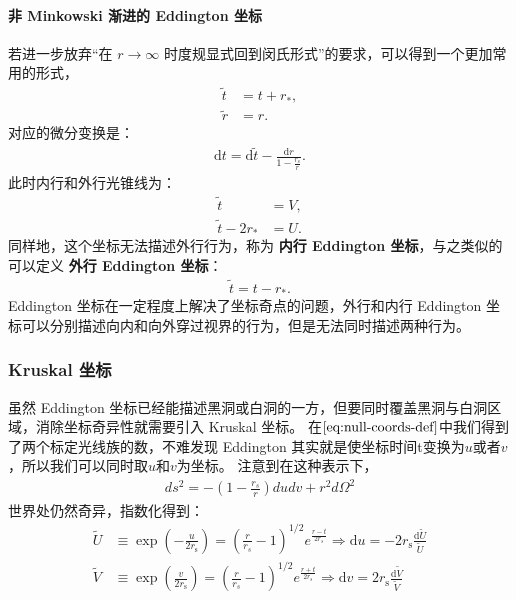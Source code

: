 \paragraph{非 Minkowski 渐进的 Eddington 坐标}
若进一步放弃“在 $r\rightarrow\infty$ 时度规显式回到闵氏形式”的要求，可以得到一个更加常用的形式，
\begin{align}
    \widetilde{t} &= t + r_{*}, \\
    \widetilde{r} &= r .
\end{align}
对应的微分变换是：
\begin{align}
    \mathrm{d}t
    = \mathrm{d}\widetilde{t}
    - \frac{\mathrm{d}r}{1 - \frac{r_{\mathrm{s}}}{r}} .
\end{align}
此时内行和外行光锥线为：
\begin{align}
    \widetilde{t} &= V, \\
    \widetilde{t} - 2r_{*} &= U.
\end{align}
同样地，这个坐标无法描述外行行为，称为 \textbf{内行 Eddington 坐标}，与之类似的可以定义 \textbf{外行 Eddington 坐标}：
\begin{align}
    \widetilde{t} = t - r_{*}.
\end{align}
Eddington 坐标在一定程度上解决了坐标奇点的问题，外行和内行 Eddington 坐标可以分别描述向内和向外穿过视界的行为，但是无法同时描述两种行为。

\subsubsection{Kruskal 坐标}
虽然 Eddington 坐标已经能描述黑洞或白洞的一方，但要同时覆盖黑洞与白洞区域，消除坐标奇异性就需要引入 Kruskal 坐标。
在$\ref{eq:null-coords-def}$中我们得到了两个标定光线族的数，不难发现 Eddington 其实就是使坐标时间t变换为$u$或者$v$，所以我们可以同时取$u$和$v$为坐标。
注意到在这种表示下，
\begin{align}
    ds^2 = -\left(1-\frac{r_s}{r}\right)du dv +r^2d\Omega^2
\end{align}
世界处仍然奇异，指数化得到：
\begin{align}
\widetilde{U}
&\equiv
\exp\left(-\frac{u}{2r_{\mathrm{s}}}\right) =\left(\frac{r}{r_s}-1\right)^{1/2}e^{\frac{r-t}{2r_s}}\Rightarrow \mathrm{d}u = -2r_{\mathrm{s}}\frac{\mathrm{d}\widetilde{U}}{\widetilde{U}}
\\
\widetilde{V}
&\equiv
\exp\left(\frac{v}{2r_{\mathrm{s}}}\right) =\left(\frac{r}{r_s}-1\right)^{1/2}e^{\frac{r+t}{2r_s}}\Rightarrow \mathrm{d}v =
2r_{\mathrm{s}}\frac{\mathrm{d}\widetilde{V}}{\widetilde{V}}
\label{eq:kruskal-UV-def}
\end{align}

